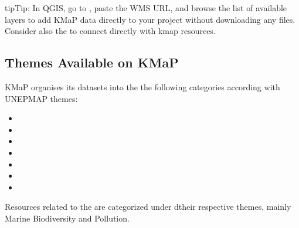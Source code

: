 \documentclass[letterpaper,10pt,english]{sphinxmanual}
\begin{document}
\begin{sphinxadmonition}{tip}{Tip:}
\sphinxAtStartPar
In QGIS, go to , paste the WMS URL,
and browse the list of available layers to add KMaP data directly to your project
without downloading any files.
Consider also the 
to connect directly with kmap resources.
\end{sphinxadmonition}


\subsection{Themes Available on KMaP}
\label{\detokenize{en/01_welcome:themes-available-on-kmap}}
\sphinxAtStartPar
KMaP organises its datasets into the the following categories according with UNEP\sphinxhyphen{}MAP themes:
\begin{itemize}
\item {} 
\sphinxAtStartPar
{} 

\item {} 
\sphinxAtStartPar
{} 

\item {} 
\sphinxAtStartPar
{} 

\item {} 
\sphinxAtStartPar
{} 

\item {} 
\sphinxAtStartPar
{} 

\item {} 
\sphinxAtStartPar
{} 

\item {} 
\sphinxAtStartPar
{} 

\end{itemize}

\sphinxAtStartPar
Resources related to the 
are categorized under dtheir respective themes, mainly Marine Biodiversity  and Pollution.
\end{document}
